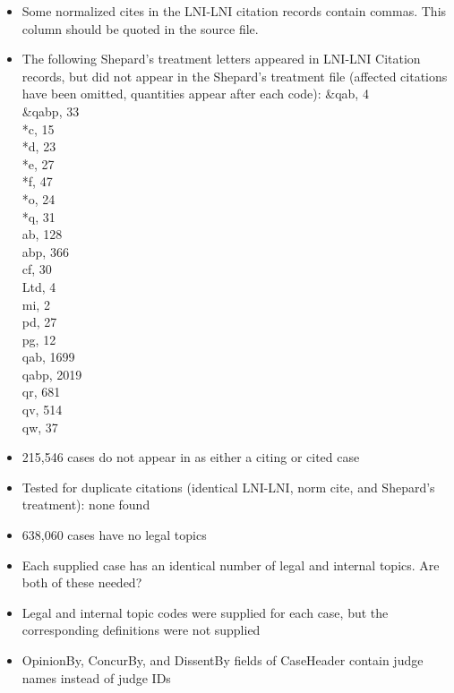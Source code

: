 \documentclass[10pt, letterpaper]{article}
\begin{document}
\begin{spacing}{1.0}
\begin{itemize}
    \item {\color{red}Some normalized cites in the LNI-LNI citation records contain commas.  This column should be quoted in the source file.}
    \item {\color{red}The following Shepard's treatment letters appeared in LNI-LNI Citation records, but did not appear in the Shepard's treatment file} (affected citations have been omitted, quantities appear after each code):
    \&qab, 4\\
    \&qabp, 33\\
    *c, 15\\
    *d, 23\\
    *e, 27\\
    *f, 47\\
    *o, 24\\
    *q, 31\\
    ab, 128\\
    abp, 366\\
    cf, 30\\
    Ltd, 4\\
    mi, 2\\
    pd, 27\\
    pg, 12\\
    qab, 1699\\
    qabp, 2019\\
    qr, 681\\
    qv, 514\\
    qw, 37\\
    
    \item 215,546 cases do not appear in as either a citing or cited case
    
    \item Tested for duplicate citations (identical LNI-LNI, norm cite, and Shepard's treatment):  none found
    
    \item 638,060 cases have no legal topics
    
    \item {\color{red}Each supplied case has an identical number of legal and internal topics.  Are both of these needed?}
    
    \item {\color{red}Legal and internal topic codes were supplied for each case, but the corresponding definitions were not supplied}

    \item {\color{red} OpinionBy, ConcurBy, and DissentBy fields of CaseHeader contain judge names instead of judge IDs}
    

\end{itemize}
\end{spacing}
\end{document}
